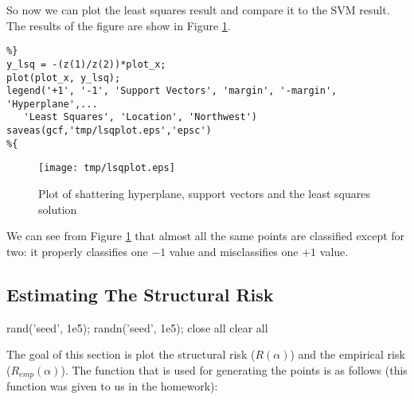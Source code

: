 \documentclass[11pt, twoside]{article}   	%
\newenvironment{matlab}{\comment}{\endcomment}
\begin{document}
So now we can plot the least squares result and compare it to the SVM
result. The results of the figure are show in Figure \ref{fig:lsq}. 
\begin{lstlisting}
%}
y_lsq = -(z(1)/z(2))*plot_x; 
plot(plot_x, y_lsq); 
legend('+1', '-1', 'Support Vectors', 'margin', '-margin', 'Hyperplane',...
   'Least Squares', 'Location', 'Northwest')
saveas(gcf,'tmp/lsqplot.eps','epsc')
%{
\end{lstlisting}

\begin{figure}[h]
\centering
\texttt{[image: tmp/lsqplot.eps]}
\caption{Plot of shattering hyperplane, support vectors and the least
squares solution}
\label{fig:lsq} 
\end{figure}

We can see from Figure \ref{fig:lsq} that almost all the same points are 
classified except for two: it properly classifies one $-1$ value and 
misclassifies one $+1$ value. 

\subsection{Estimating The Structural Risk}
\begin{matlab}
rand('seed', 1e5);
randn('seed', 1e5);
close all 
clear all

\end{matlab}
The goal of this section is plot the structural risk ($R(\alpha)$) and 
the empirical risk ($R_{emp}(\alpha)$). The function that is used for
generating the points is as follows (this function was given to us 
in the homework): 


\end{document}
